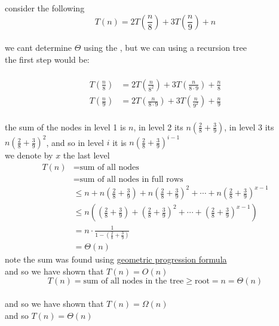 \documentclass[a4paper,12pt]{article}
\begin{document}
\begin{my_example}
consider the following \\[0pt]
\[
  T(n) = 2T\left(\frac{n}{8}\right) + 3T\left(\frac{n}{9}\right) + n
\]\\[0pt]
we cant determine \(\Theta\) using the , but we can using a recursion tree\\[0pt]
the first step would be:\\[0pt]
\\[0pt]

\begin{align*}
  T\left(\frac{n}{8}\right) &= 2T\left(\frac{n}{8^2}\right) + 3T\left(\frac{n}{8\cdot9}\right) + \frac{n}{8}\\
  T\left(\frac{n}{9}\right) &= 2T\left(\frac{n}{8\cdot9}\right) + 3T\left(\frac{n}{9^2}\right) + \frac{n}{9}
\end{align*}
\\[0pt]

the sum of the nodes in level 1 is \(n\), in level 2 its \(n\left(\frac{2}{8}+\frac{3}{9}\right)\), in level 3 its \(n\left(\frac{2}{8}+\frac{3}{9}\right)^2\), and so in level \(i\) it is \(n\left(\frac{2}{8}+\frac{3}{9}\right)^{i-1}\)\\[0pt]
we denote by \(x\) the last level\\[0pt]
\begin{align*}
  T(n) &= \text{sum of all nodes}\\
  &= \text{sum of all nodes in full rows}\\
  &\leq n+n\left(\frac{2}{8}+\frac{3}{9}\right)+n\left(\frac{2}{8}+\frac{3}{9}\right)^2+\cdots+n\left(\frac{2}{8}+\frac{3}{9}\right)^{x-1}\\
  &\leq n\left(\left(\frac{2}{8}+\frac{3}{9}\right)+\left(\frac{2}{8}+\frac{3}{9}\right)^2+\cdots+\left(\frac{2}{8}+\frac{3}{9}\right)^{x-1}\right)\\
  &= n\cdot \frac{1}{1-\left(\frac{2}{8}+\frac{3}{9}\right)}\\
  &= \Theta(n)
\end{align*}
note the sum was found using \href{20220711182517-sum_of_geometric_progression.org}{geometric progression formula}\\[0pt]
and so we have shown that \(T(n) = O(n)\)\\[0pt]
\[
  T(n) = \text{sum of all nodes in the tree} \ge \text{root} = n = \Theta(n)
\]\\[0pt]
and so we have shown that \(T(n) = \Omega(n)\)\\[0pt]
and so \(T(n) = \Theta(n)\)\\[0pt]
\end{my_example}
\end{document}
